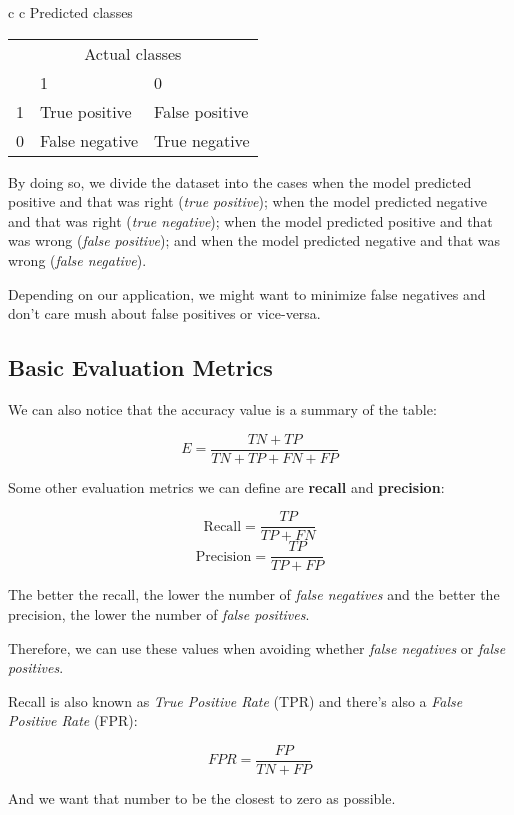 \documentclass[12pt, a4paper, oneside]{article}
\begin{document}
\begin{center}
\begin{tabular}{c c}
Predicted classes
\begin{tabular}{c|| m{3.65em} | m{3.6em} ||}
\multicolumn{3}{c}{Actual classes} \\
  & 1 & 0 \\ \hline\hline
1 & True positive & False positive \\ \hline
0 & False negative & True negative \\ \hline
\end{tabular}
\end{tabular}
\end{center}

By doing so, we divide the dataset into the cases when the model predicted
positive and that was right (\textit{true positive}); when the model predicted
negative and that was right (\textit{true negative}); when the model predicted
positive and that was wrong (\textit{false positive}); and when the model
predicted negative and that was wrong (\textit{false negative}).

Depending on our application, we might want to minimize false negatives and
don't care mush about false positives or vice-versa.

\subsection{Basic Evaluation Metrics}

We can also notice that the accuracy value is a summary of the table:

\[ E=\dfrac{TN+TP}{TN+TP+FN+FP} \]

Some other evaluation metrics we can define are \textbf{recall} and
\textbf{precision}:

\[ \textrm{Recall} = \dfrac{TP}{TP+FN} \]
\[ \textrm{Precision} = \dfrac{TP}{TP+FP} \]

The better the recall, the lower the number of \textit{false negatives} and
the better the precision, the lower the number of \textit{false positives}.

Therefore, we can use these values when avoiding whether \textit{false
negatives} or \textit{false positives}.

Recall is also known as \textit{True Positive Rate} (TPR) and there's also a
\textit{False Positive Rate} (FPR):

\[ FPR = \dfrac{FP}{TN+FP} \]

And we want that number to be the closest to zero as possible.
\end{document}
